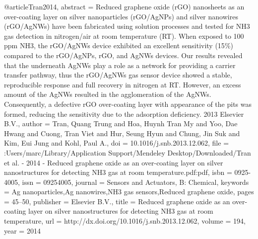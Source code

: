 @article{Tran2014,
abstract = {Reduced graphene oxide (rGO) nanosheets as an over-coating layer on silver nanoparticles (rGO/AgNPs) and silver nanowires (rGO/AgNWs) have been fabricated using solution processes and tested for NH3 gas detection in nitrogen/air at room temperature (RT). When exposed to 100 ppm NH3, the rGO/AgNWs device exhibited an excellent sensitivity (15{\%}) compared to the rGO/AgNPs, rGO, and AgNWs devices. Our results revealed that the underneath AgNWs play a role as a network for providing a carrier transfer pathway, thus the rGO/AgNWs gas sensor device showed a stable, reproducible response and full recovery in nitrogen at RT. However, an excess amount of the AgNWs resulted in the agglomeration of the AgNWs. Consequently, a defective rGO over-coating layer with appearance of the pits was formed, reducing the sensitivity due to the adsorption deficiency. {\textcopyright} 2013 Elsevier B.V.},
author = {Tran, Quang Trung and Hoa, Huynh Tran My and Yoo, Dae Hwang and Cuong, Tran Viet and Hur, Seung Hyun and Chung, Jin Suk and Kim, Eui Jung and Kohl, Paul A.},
doi = {10.1016/j.snb.2013.12.062},
file = {:Users/marc/Library/Application Support/Mendeley Desktop/Downloaded/Tran et al. - 2014 - Reduced graphene oxide as an over-coating layer on silver nanostructures for detecting NH3 gas at room temperature.pdf:pdf},
isbn = {0925-4005},
issn = {09254005},
journal = {Sensors and Actuators, B: Chemical},
keywords = {Ag nanoparticles,Ag nanowires,NH3 gas sensors,Reduced graphene oxide},
pages = {45--50},
publisher = {Elsevier B.V.},
title = {{Reduced graphene oxide as an over-coating layer on silver nanostructures for detecting NH3 gas at room temperature}},
url = {http://dx.doi.org/10.1016/j.snb.2013.12.062},
volume = {194},
year = {2014}
}
